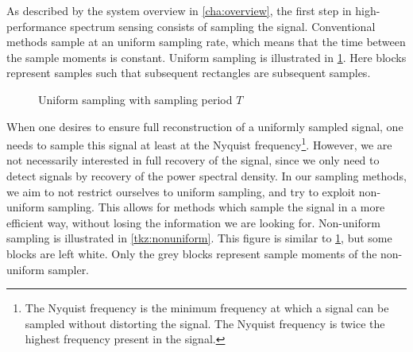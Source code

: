 \documentclass[a4paper, openany, oneside]{memoir}
\begin{document}
As described by the system overview in \cref{cha:overview}, the first step in high-performance spectrum sensing consists of sampling the signal. Conventional methods sample at an uniform sampling rate, which means that the time between the sample moments is constant. Uniform sampling is illustrated in \cref{tkz:uniform}. Here blocks represent samples such that subsequent rectangles are subsequent samples.

\begin{figure}[H]
\centering
{}
\caption{Uniform sampling with sampling period $T$}\label{tkz:uniform}
\end{figure}

When one desires to ensure full reconstruction of a uniformly sampled signal, one needs to sample this signal at least at the Nyquist frequency\footnote{The Nyquist frequency is the minimum frequency at which a signal can be sampled without distorting the signal. The Nyquist frequency is twice the highest frequency present in the signal.}. However, we are not necessarily interested in full recovery of the signal, since we only need to detect signals by recovery of the power spectral density. In our sampling methods, we aim to not restrict ourselves to uniform sampling, and try to exploit non-uniform sampling. This allows for methods which sample the signal in a more efficient way, without losing the information we are looking for. Non-uniform sampling is illustrated in \cref{tkz:nonuniform}. This figure is similar to \cref{tkz:uniform}, but some blocks are left white. Only the grey blocks represent sample moments of the non-uniform sampler.
\end{document}
